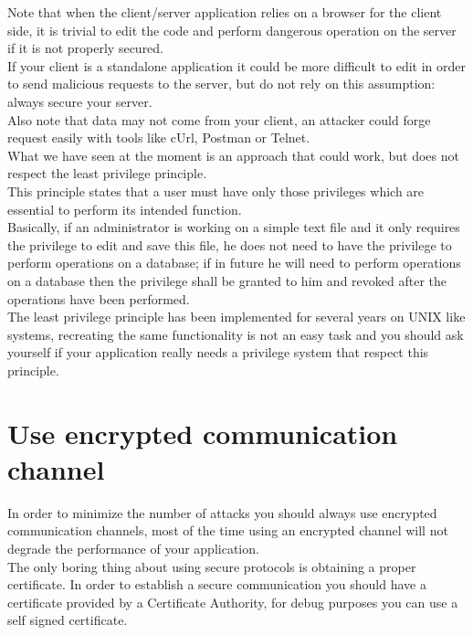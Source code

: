 Note that when the client/server application relies on a browser for the client side, it is trivial to edit the code and perform dangerous operation on the server if it is not properly secured.\\
If your client is a standalone application it could be more difficult to edit in order to send malicious requests to the server, but do not rely on this assumption: always secure your server.\\
Also note that data may not come from your client, an attacker could forge request easily with tools like cUrl, Postman or Telnet.\\
What we have seen at the moment is an approach that could work, but does not respect the least privilege principle.\\
This principle states that a user must have only those privileges which are essential to perform its intended function.\\
Basically, if an administrator is working on a simple text file and it only requires the privilege to edit and save this file, he does not need to have the privilege to perform operations on a database; if in future he will need to perform operations on a database then the privilege shall be granted to him and revoked after the operations have been performed.\\
The least privilege principle has been implemented for several years on UNIX like systems, recreating the same functionality is not an easy task and you should ask yourself if your application really needs a privilege system that respect this principle.

\section{Use encrypted communication channel}
In order to minimize the number of attacks you should always use encrypted communication channels, most of the time
using an encrypted channel will not degrade the performance of your application.\\
The only boring thing about using secure protocols is obtaining a proper certificate. In order to establish a secure communication you should have
a certificate provided by a Certificate Authority, for debug purposes you can use a self signed certificate.\\


